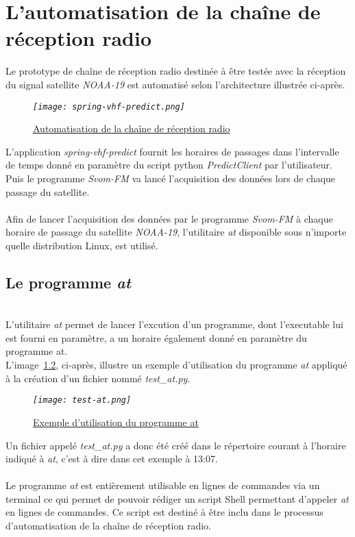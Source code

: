 \documentclass[12pt,fleqn]{book} %
\begin{document}
\chapter{L'automatisation de la chaîne de réception radio}
Le prototype de chaîne de réception radio destinée à être testée avec la réception du signal satellite \emph{NOAA-19} est automatisé selon l'architecture illustrée ci-après.
\begin{figure}[H]
	\centering
	\itshape
	\texttt{[image: spring-vhf-predict.png]}
	\caption{\label{} \underline{Automatisation de la chaîne de réception radio}}
\end{figure}
\noindent L'application \emph{spring-vhf-predict} fournit les horaires de passages dans l'intervalle de temps donné en paramètre du script python \emph{PredictClient} par l'utilisateur. Puis le programme \emph{Svom-FM} va lancé l'acquisition des données lors de chaque passage du satellite.
~\\\\Afin de lancer l'acquisition des données par le programme \emph{Svom-FM} à chaque horaire de passage du satellite \emph{NOAA-19}, l'utilitaire \emph{at} disponible sous n'importe quelle distribution Linux, est utilisé.
\section{Le programme \emph{at}}
~\\\indent L'utilitaire \emph{at} permet de lancer l'excution d'un programme, dont l'executable lui est fourni en paramètre, a un horaire également donné en paramètre du programme at.
~\\L'image~\underline{\color{blue}\ref{test-at}}, ci-après, illustre un exemple d'utilisation du programme \emph{at} appliqué à la création d'un fichier nommé \emph{test\_at.py}.
\begin{figure}[H]
	\centering
	\itshape
	\texttt{[image: test-at.png]}
	\caption{\label{test-at} \underline{Exemple d'utilisation du programme at}}
\end{figure}
\noindent Un fichier appelé \emph{test\_at.py} a donc été créé dans le répertoire courant à l'horaire indiqué à \emph{at}, c'est à dire dans cet exemple à 13:07.
~\\\\Le programme \emph{at} est entièrement utilisable en lignes de commandes via un terminal ce qui permet de pouvoir rédiger un script Shell permettant d'appeler \emph{at} en lignes de commandes. Ce script est destiné à être inclu dans le processus d'automatisation de la chaîne de réception radio.
\end{document}
